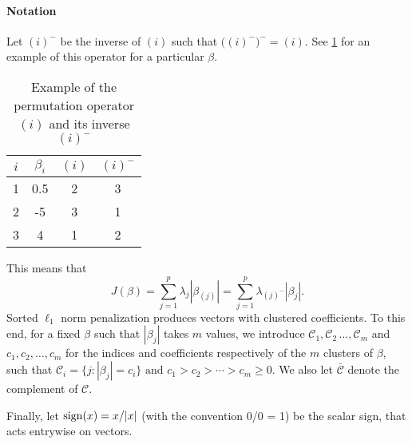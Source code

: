 \paragraph{Notation}\label{sec:notation}

Let \((i)^{-}\) be the inverse of \((i)\) such that
\(\big((i)^-\big)^- = (i)\). See \cref{tab:permutation-example} for an
example of this operator for a particular \(\beta\).
\begin{table}
  \centering
  \caption{Example of the permutation operator \((i)\) and its inverse
    \((i)^-\)\label{tab:permutation-example}}
  \begin{tabular}{cccc}
    \toprule
    \(i\) & \(\beta_i\) & \((i)\) & \((i)^-\) \\
    \midrule
    1     & 0.5         & 2       & 3         \\
    2     & -5          & 3       & 1         \\
    3     & 4           & 1       & 2         \\
    \bottomrule
  \end{tabular}
\end{table}
This means that
\[
  J(\beta) = \sum_{j=1}^p \lambda_j |\beta_{(j)}|
  = \sum_{j=1}^p \lambda_{(j)^-}|\beta_j|.
\]
Sorted $\ell_1$ norm penalization produces vectors with clustered coefficients.
To this end, for a fixed $\beta$ such that $|\beta_j|$ takes $m$ values, we introduce \(\mathcal{C}_1, \mathcal{C}_2\, \dots, \mathcal{C}_m\) and \(c_1,
c_2, \dots, c_m\) for the indices and coefficients respectively of the \(m\)
clusters of $\beta$, such that
  $
  \mathcal{C}_i = \{j : |\beta_j| = c_i\} \text{ and }%
  c_1 > c_2 > \cdots > c_m \geq 0.
  $
We also let \(\bar{\mathcal{C}}\) denote the complement of \(\mathcal{C}\).

Finally, let $\operatorname{sign}(x) = x / |x|$ (with the convention 0/0 = 1) be the scalar sign, that acts entrywise on vectors.



